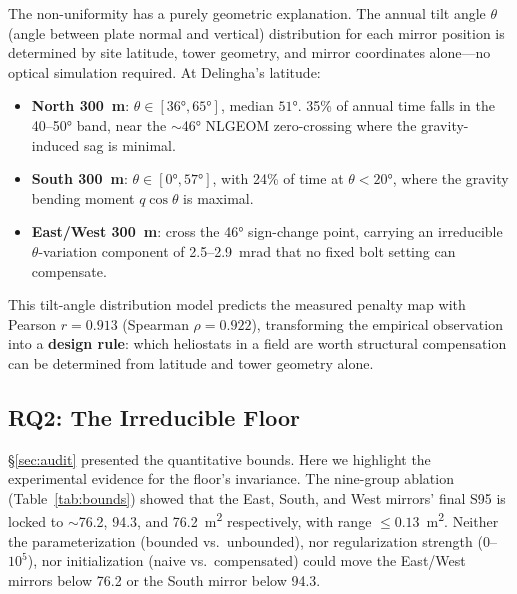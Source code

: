 \documentclass{CVM}
\begin{document}
The non-uniformity has a purely geometric explanation. The annual tilt angle
$\theta$ (angle between plate normal and vertical) distribution for each
mirror position is determined by site latitude, tower geometry, and mirror
coordinates alone---no optical simulation required. At Delingha's latitude:

\begin{itemize}
  \item \textbf{North \SI{300}{\meter}}: $\theta \in [36\si{\degree}, 65\si{\degree}]$,
  median $51\si{\degree}$. 35\% of annual time falls in the 40--50\si{\degree}
  band, near the $\sim$46\si{\degree} NLGEOM zero-crossing where the
  gravity-induced sag is minimal.
  \item \textbf{South \SI{300}{\meter}}: $\theta \in [0\si{\degree}, 57\si{\degree}]$,
  with 24\% of time at $\theta < 20\si{\degree}$, where the gravity bending
  moment $q\cos\theta$ is maximal.
  \item \textbf{East/West \SI{300}{\meter}}: cross the 46\si{\degree} sign-change
  point, carrying an irreducible $\theta$-variation component of
  2.5--2.9~mrad that no fixed bolt setting can compensate.
\end{itemize}

This tilt-angle distribution model predicts the measured penalty map with
Pearson $r = 0.913$ (Spearman $\rho = 0.922$), transforming the empirical
observation into a \textbf{design rule}: which heliostats in a field are worth
structural compensation can be determined from latitude and tower geometry
alone.

\subsection{RQ2: The Irreducible Floor}

\S\ref{sec:audit} presented the quantitative bounds. Here we highlight the
experimental evidence for the floor's invariance. The nine-group ablation
(Table~\ref{tab:bounds}) showed that the East, South, and West mirrors' final
S95 is locked to $\sim$76.2, 94.3, and 76.2~m\textsuperscript{2} respectively,
with range $\le 0.13$~m\textsuperscript{2}. Neither the parameterization
(bounded vs.\ unbounded), nor regularization strength (0--$10^5$), nor
initialization (naive vs.\ compensated) could move the East/West mirrors below
76.2 or the South mirror below 94.3.
\end{document}
